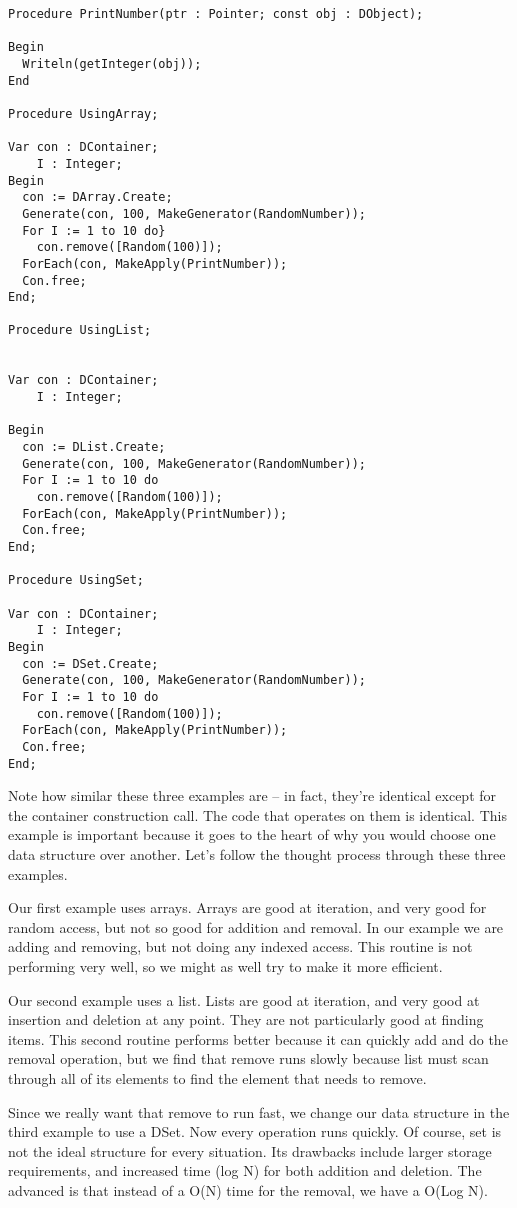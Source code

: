 \documentclass{report}
\begin{document}
\begin{lstlisting}
Procedure PrintNumber(ptr : Pointer; const obj : DObject);

Begin
  Writeln(getInteger(obj));
End

Procedure UsingArray;

Var con : DContainer;
    I : Integer;
Begin
  con := DArray.Create;
  Generate(con, 100, MakeGenerator(RandomNumber));
  For I := 1 to 10 do}
    con.remove([Random(100)]);
  ForEach(con, MakeApply(PrintNumber));
  Con.free;
End;

Procedure UsingList;


Var con : DContainer;
    I : Integer;

Begin
  con := DList.Create;
  Generate(con, 100, MakeGenerator(RandomNumber));
  For I := 1 to 10 do
    con.remove([Random(100)]);
  ForEach(con, MakeApply(PrintNumber));
  Con.free;
End;

Procedure UsingSet;

Var con : DContainer;
    I : Integer;
Begin
  con := DSet.Create;
  Generate(con, 100, MakeGenerator(RandomNumber));
  For I := 1 to 10 do
    con.remove([Random(100)]);
  ForEach(con, MakeApply(PrintNumber));
  Con.free;
End;
\end{lstlisting}

Note how similar these three examples are -- in fact, they're identical
except for the container construction call. The code that operates on them
is identical. This example is important because it goes to the heart of why
you would choose one data structure over another. Let's follow the thought
process through these three examples.

Our first example uses arrays. Arrays are good at iteration, and very good
for random access, but not so good for addition and removal. In our example
we are adding and removing, but not doing any indexed access. This routine
is not performing very well, so we might as well try to make it more
efficient.

Our second example uses a list. Lists are good at iteration, and very good
at insertion and deletion at any point. They are not particularly good at
finding items. This second routine performs better because it can quickly
add and do the removal operation, but we find that remove runs slowly
because list must scan through all of its elements to find the element that
needs to remove.

Since we really want that remove to run fast, we change our data structure
in the third example to use a DSet. Now every operation runs quickly.  Of
course, set is not the ideal structure for every situation. Its drawbacks
include larger storage requirements, and increased time (log N) for both
addition and deletion. The advanced is that instead of a O(N) time for the
removal, we have a O(Log N).
\end{document}
